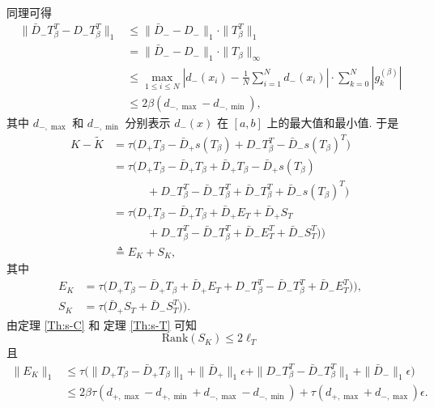 \documentclass{ecnumaster}
\begin{document}
同理可得
\begin{align*}
  \|\bar{D}_- T_{\beta}^{T} - D_- T_{\beta}^{T}\|_1 
  & \leq \|\bar{D}_- - D_-\|_1\cdot \|T_{\beta}^{T}\|_1 \\
    &= \| \bar{D}_- - D_- \|_1\cdot \| T_{\beta}\|_\infty\\
    &\leq \max _{1 \leq i \leq N} 
     \left|d_{-}(x_i) - \frac{1}{N} \sum\limits _{i=1}^{N} d_{-}(x_i)\right|\cdot
        \sum\limits_{k=0}^{N} \left|g_k^{(\beta)}\right|\\
    &\leq 2\beta (d_{-,\max}-d_{-,\min}),
\end{align*}
其中 $d_{-,\max}$ 和 $d_{-,\min}$ 分别表示 $d_-(x)$
在 $[a,b]$ 上的最大值和最小值.
%
于是
\begin{align*}
  K-\tilde{K}
  & = \tau \Big(D_+ T_{\beta} - \bar{D}_+ s(T_{\beta})
         + D_- T_{\beta}^T - \bar{D}_- s(T_{\beta})^T\Big) \\
  & = \tau \Big(D_+ T_{\beta} - \bar{D}_+ T_{\beta} + \bar{D}_+ T_{\beta} - \bar{D}_+ s(T_{\beta}) \\
  & \quad\qquad  + D_- T_{\beta}^T - \bar{D}_- T_{\beta}^T + \bar{D}_- T_{\beta}^T + \bar{D}_- s(T_{\beta})^T\Big) \\
  & = \tau \Big(D_+ T_{\beta} - \bar{D}_+ T_{\beta} + \bar{D}_+ E_T + \bar{D}_+ S_T \\
  & \quad\qquad  + D_- T_{\beta}^T - \bar{D}_- T_{\beta}^T + \bar{D}_- E_T^T + \bar{D}_- S_T^T)\Big) \\
  & \triangleq E_K + S_K,
\end{align*}
其中 
\begin{align*}
  E_K & = \tau \Big(D_+ T_{\beta} - \bar{D}_+ T_{\beta} + \bar{D}_+ E_T
    + D_- T_{\beta}^T - \bar{D}_- T_{\beta}^T + \bar{D}_- E_T^T)\Big),\\
  S_K & = \tau \Big(\bar{D}_+ S_T + \bar{D}_- S_T^T)\Big).
\end{align*}
由定理 \ref{Th:s-C} 和 定理 \ref{Th:s-T} 可知 
$$ \mathrm{Rank}(S_K)\leq 2\ell_T $$
且 
\begin{align*}
  \|E_K\|_1 
  & \leq \tau\Big(\|D_+ T_{\beta} - \bar{D}_+ T_{\beta}\|_1
     + \|\bar{D}_+\|_1\epsilon + \|D_- T_{\beta}^T - \bar{D}_- T_{\beta}^T\|_1
     + \|\bar{D}_-\|_1\epsilon \Big) \\
  & \leq 2\beta\tau (d_{+,\max}-d_{+,\min}+d_{-,\max}-d_{-,\min})
     +\tau(d_{+,\max}+ d_{-,\max})\epsilon.
\end{align*}
\end{document}
